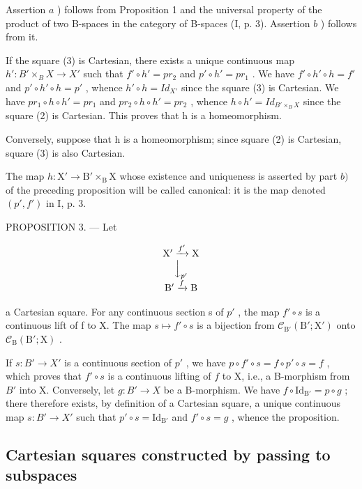 Assertion \(a\) ) follows from Proposition 1 and the universal property of the product of two B-spaces in the category of B-spaces (I, p. 3). Assertion \(b\) ) follows from it.

If the square (3) is Cartesian, there exists a unique continuous map \(h'\colon B'\times_{B}X\to X'\) such that \(f'\circ h' = pr_{2}\) and \(p'\circ h' = pr_{1}\) . We have \(f'\circ h'\circ h = f'\) and \(p'\circ h'\circ h = p'\) , whence \(h'\circ h = Id_{X'}\) since the square (3) is Cartesian. We have \(pr_{1}\circ h\circ h' = pr_{1}\) and \(pr_{2}\circ h\circ h' = pr_{2}\) , whence \(h\circ h' = Id_{B'\times_{B}X}\) since the square (2) is Cartesian. This proves that h is a homeomorphism.

Conversely, suppose that h is a homeomorphism; since square (2) is Cartesian, square (3) is also Cartesian.

The map \(h \colon \mathrm{X}' \to \mathrm{B}' \times_{\mathrm{B}} \mathrm{X}\) whose existence and uniqueness is asserted by part \(b)\) of the preceding proposition will be called canonical: it is the map denoted \((p', f')\) in I, p. 3.

PROPOSITION 3. --- Let

\[
\begin{array}{c} \mathrm {X^ {\prime}} \xrightarrow {f ^ {\prime}} \mathrm{X} \\ \Big \downarrow_ {p ^ {\prime}} \\ \mathrm {B^ {\prime}} \xrightarrow {f} \mathrm{B} \end{array}
\]

a Cartesian square. For any continuous section s of \(p'\) , the map \(f'\circ s\) is a continuous lift of f to X. The map \(s\mapsto f'\circ s\) is a bijection from \(\mathcal{C}_{\mathrm{B}'}(\mathrm{B}';\mathrm{X}')\) onto \(\mathcal{C}_{\mathrm{B}}(\mathrm{B}';\mathrm{X})\) .

If \(s \colon B' \to X'\) is a continuous section of \(p'\) , we have \(p \circ f' \circ s = f \circ p' \circ s = f\) , which proves that \(f' \circ s\) is a continuous lifting of \(f\) to X, i.e., a B-morphism from \(B'\) into X. Conversely, let \(g \colon B' \to X\) be a B-morphism. We have \(f \circ \mathrm{Id}_{\mathrm{B}'} = p \circ g\) ; there therefore exists, by definition of a Cartesian square, a unique continuous map \(s \colon B' \to X'\) such that \(p' \circ s = \mathrm{Id}_{\mathrm{B}'}\) and \(f' \circ s = g\) , whence the proposition.

\subsection{Cartesian squares constructed by passing to subspaces}

